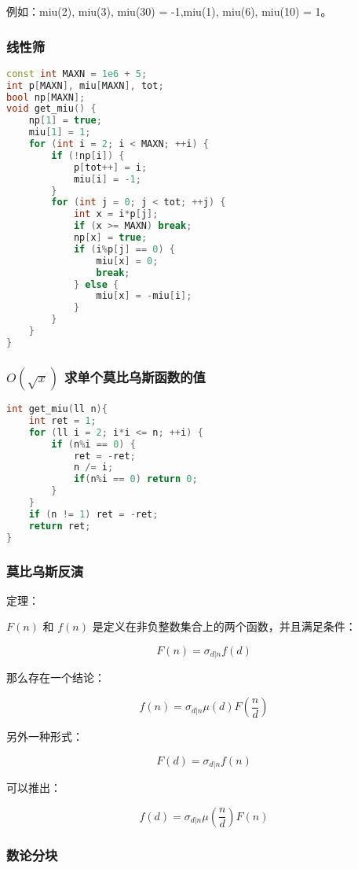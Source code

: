 例如：miu(2), miu(3), miu(30) = -1,miu(1), miu(6), miu(10) = 1。

\subsubsection{线性筛}

\begin{lstlisting}[language=C++]
const int MAXN = 1e6 + 5;
int p[MAXN], miu[MAXN], tot;
bool np[MAXN];
void get_miu() {
    np[1] = true;
    miu[1] = 1;
    for (int i = 2; i < MAXN; ++i) {
        if (!np[i]) {
            p[tot++] = i;
            miu[i] = -1;
        }
        for (int j = 0; j < tot; ++j) {
            int x = i*p[j];
            if (x >= MAXN) break;
            np[x] = true;
            if (i%p[j] == 0) {
                miu[x] = 0;
                break;
            } else {
                miu[x] = -miu[i];
            }
        }
    }
}
\end{lstlisting}

\subsubsection{$O(\sqrt{x})$ 求单个莫比乌斯函数的值}

\begin{lstlisting}[language=C++]
int get_miu(ll n){
    int ret = 1;
    for (ll i = 2; i*i <= n; ++i) {
        if (n%i == 0) {
            ret = -ret;
            n /= i;
            if(n%i == 0) return 0;
        }
    }
    if (n != 1) ret = -ret;
    return ret;
}
\end{lstlisting}

\subsubsection{莫比乌斯反演}

定理：

$F(n)$ 和 $f(n)$ 是定义在非负整数集合上的两个函数，并且满足条件：

$$F(n) = \sigma_{d | n} f(d)$$

那么存在一个结论：

$$f(n) = \sigma_{d | n} \mu (d) F(\frac{n}{d})$$

另外一种形式：

$$F(d) = \sigma_{d | n} f(n)$$

可以推出：

$$f(d) = \sigma_{d | n} \mu (\frac{n}{d}) F(n)$$

\subsubsection{数论分块}

